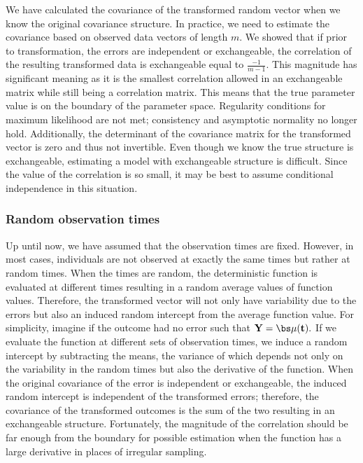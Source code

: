 We have calculated the covariance of the transformed random vector when we know the original covariance structure. In practice, we need to estimate the covariance based on observed data vectors of length $m$. We showed that if prior to transformation, the errors are independent or exchangeable, the correlation of the resulting transformed data is exchangeable equal to $\frac{-1}{m-1}$. This magnitude has significant meaning as it is the smallest correlation allowed in an exchangeable matrix while still being a correlation matrix. This means that the true parameter value is on the boundary of the parameter space. Regularity conditions for maximum likelihood are not met; consistency and asymptotic normality no longer hold. Additionally, the determinant of the covariance matrix for the transformed vector is zero and thus not invertible. Even though we know the true structure is exchangeable, estimating a model with exchangeable structure is difficult. Since the value of the correlation is so small, it may be best to assume conditional independence in this situation. 
 
\subsubsection{Random observation times} 
Up until now, we have assumed that the observation times are fixed. However, in most cases, individuals are not observed at exactly the same times but rather at random times. When the times are random, the deterministic function is evaluated at different times resulting in a random average values of function values. Therefore, the transformed vector will not only have variability due to the errors but also an induced random intercept from the average function value. For simplicity, imagine if the outcome had no error such that
$\B Y =  \bs\mu(\B t). $
If we evaluate the function at different sets of observation times, we induce a random intercept by subtracting the means, the variance of which depends not only on the variability in the random times but also the derivative of the function. When the original covariance of the error is independent or exchangeable, the induced random intercept is independent of the transformed errors; therefore, the covariance of the transformed outcomes is the sum of the two resulting in an exchangeable structure. Fortunately, the magnitude of the correlation should be far enough from the boundary for possible estimation when the function has a large derivative in places of irregular sampling.

